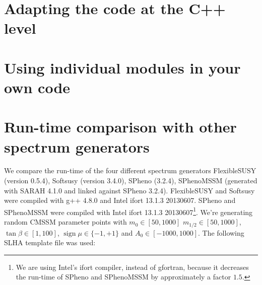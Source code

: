\documentclass[final,3p,times,pdflatex]{elsarticle}
\DeclareMathOperator{\sign}{sign}
\begin{document}
\section{Adapting the code at the C++ level}
\section{Using individual modules in your own code}

\section{Run-time comparison with other spectrum generators}

We compare the run-time of the four different spectrum generators
FlexibleSUSY (version 0.5.4), Softsusy (version 3.4.0), SPheno
(3.2.4), SPhenoMSSM (generated with SARAH 4.1.0 and linked against
SPheno 3.2.4).  FlexibleSUSY and Softsusy were compiled with g++ 4.8.0
and Intel ifort 13.1.3 20130607.  SPheno and SPhenoMSSM were compiled
with Intel ifort 13.1.3 20130607\footnote{We are using Intel's ifort
  compiler, instead of gfortran, because it decreases the run-time of
  SPheno and SPhenoMSSM by approximately a factor $1.5$.}.  We're
generating random CMSSM parameter points with $m_0\in [50,1000]$
$m_{1/2}\in [50,1000]$, $\tan\beta\in [1,100]$, $\sign\mu\in
\{-1,+1\}$ and $A_0\in [-1000,1000]$.  The following SLHA template
file was used:
%
\end{document}
